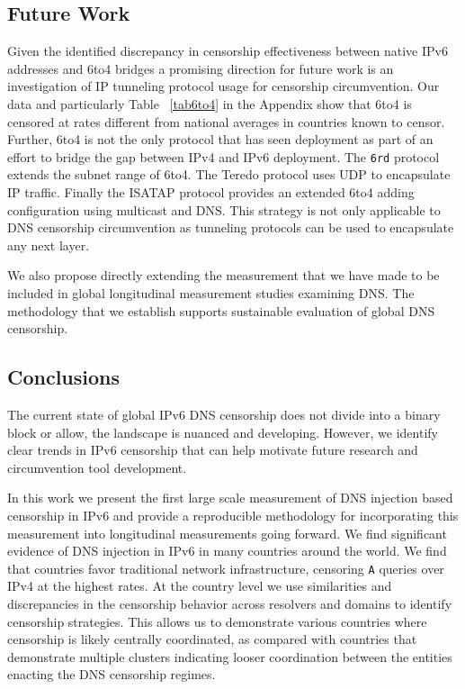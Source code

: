 
\subsection{Future Work}
\label{sec:discussion:future_work}

Given the identified discrepancy in censorship effectiveness between native IPv6
addresses and 6to4 bridges a promising direction for future
work is an investigation of IP tunneling protocol usage for censorship circumvention.
Our data and particularly Table ~\ref{tab6to4} in the Appendix show that 6to4 is
censored at rates different from national averages in countries known to censor.
Further, 6to4 is not the only protocol that has seen deployment as part of an
effort to bridge the gap between IPv4 and IPv6 deployment. The \texttt{6rd} protocol
extends the subnet range of 6to4. The Teredo
protocol uses UDP to encapsulate IP traffic. Finally the ISATAP protocol provides
an extended 6to4 adding configuration using multicast and DNS.
This strategy is not only applicable to DNS censorship circumvention as tunneling
protocols can be used to encapsulate any next layer.


We also propose directly extending the measurement that we have made to be
included in global longitudinal measurement studies examining DNS. The methodology
that we establish supports sustainable evaluation of global DNS censorship.

\subsection{Conclusions}

The current state of global IPv6 DNS censorship does not divide into a binary
block or allow, the landscape is nuanced and developing. However, we identify
clear trends in IPv6 censorship that can help motivate future research and
circumvention tool development.

In this work we present the first large scale measurement of DNS injection based
censorship in IPv6 and provide a reproducible methodology for incorporating this
measurement into longitudinal measurements going forward. We find significant
evidence of DNS injection in IPv6 in many countries around the world.
We find that countries favor traditional network infrastructure, censoring
\texttt{A} queries over IPv4 at the highest rates. At the country level we
use similarities and discrepancies in the censorship behavior across resolvers
and domains to identify censorship strategies. This allows us to demonstrate
various countries where censorship is likely centrally coordinated, as compared
with countries that demonstrate multiple clusters indicating looser coordination
between the entities enacting the DNS censorship regimes.

